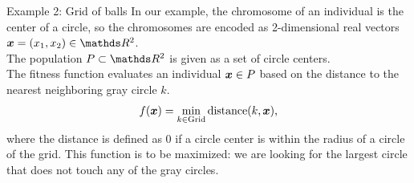 \documentclass[11pt,compress,t,notes=noshow, xcolor=table]{beamer}
\begin{document}
\begin{framev}{Example 2: Grid of balls}
In our example, the chromosome of an individual is the center of a circle, so the chromosomes are encoded as 2-dimensional real vectors $\xv = (x_1, x_2) \in \R^2$.\\
\spacer
The population $P \subset \R^2$ is given as a set of circle centers.\\
\spacer
The fitness function evaluates an individual $\bm{x} \in P$ based on the distance to the nearest neighboring gray circle $k$.
$$
f(\bm{x}) = \min_{k \in \text{Grid}} \text{distance} (k, \bm{x}),
$$
where the distance is defined as $0$ if a circle center is within the radius of a circle of the grid.
This function is to be maximized: we are looking for the largest circle that does not touch any of the gray circles.
\end{framev}


\endlecture
\end{document}
